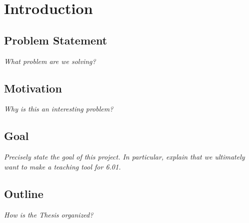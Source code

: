 

\chapter{Introduction}

\section{Problem Statement}

\textit{What problem are we solving?}

\section{Motivation}

\textit{Why is this an interesting problem?}

\section{Goal}

\textit{Precisely state the goal of this project. In particular, explain that we
ultimately want to make a teaching tool for 6.01.}

\section{Outline}

\textit{How is the Thesis organized?}

%

